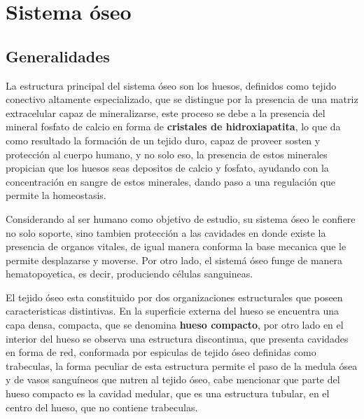 \documentclass[letterpaper,12pt,oneside]{book}
\begin{document}
    \section{Sistema óseo}

    \subsection{Generalidades}


    La estructura principal del sistema óseo son los huesos, definidos como tejido conectivo altamente especializado, que se distingue por la presencia de una matriz extracelular capaz de mineralizarse, este proceso se debe a la presencia del mineral fosfato de calcio en forma de \textbf{cristales de hidroxiapatita}, lo que da como resultado la formación de un tejido duro, capaz de proveer sosten y protección al cuerpo humano, y no solo eso, la presencia de estos minerales propician que los huesos seas depositos de calcio y fosfato, ayudando con la concentración en sangre de estos minerales, dando paso a una regulación que permite la homeostasis. 

    \vspace{10pt}


    Considerando al ser humano como objetivo de estudio, su sistema óseo le confiere no solo soporte, sino tambien protección a las cavidades en donde existe la presencia de organos vitales, de igual manera conforma la base mecanica que le permite desplazarse y moverse. Por otro lado, el sistemá óseo funge de manera hematopoyetica, es decir, produciendo células sanguineas.  

    \vspace{10pt}

    El tejido óseo esta constituido por dos organizaciones estructurales que poseen caracteristicas distintivas. En la superficie externa del hueso se encuentra una capa densa, compacta, que se denomina \textbf{hueso compacto}, por otro lado en el interior del hueso se observa una estructura discontinua, que presenta cavidades en forma de red, conformada por espiculas de tejido óseo definidas como trabeculas, la forma peculiar de esta estructura permite el paso de la medula ósea y de vasos sanguíneos que nutren al tejido óseo, cabe mencionar que parte del hueso compacto es la cavidad medular, que es una estructura tubular, en el centro del hueso, que no contiene trabeculas.


    \vspace{10pt}
\end{document}
